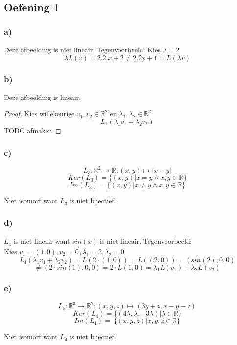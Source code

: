 \documentclass[lineaire_algebra_oplossingen.tex]{subfiles}
\begin{document}
\subsection{Oefening 1}
\subsubsection*{a)}
Deze afbeelding is niet lineair. Tegenvoorbeeld: Kies $\lambda = 2$\\
\[
\lambda L(v) = 2 . 2 . x + 2 \neq 2 . 2 x + 1 = L(\lambda v)
\]

\subsubsection*{b)}
Deze afbeelding is lineair.
\begin{proof}
Kies willekeurige $v_1, v_2 \in \mathbb{R}^2$ en $\lambda_1, \lambda_2 \in \mathbb{R}^2$
\[
L_2(\lambda_1v_1 + \lambda_2v_2)
\]
TODO afmaken
\end{proof}

\subsubsection*{c)}
$$
L_3:\mathbb{R}^2\rightarrow\mathbb{R}:(x,y)\mapsto |x-y|
$$
$$
Ker(L_3)= \{(x,y)|x=y \wedge x,y \in \mathbb{R} \}
$$
$$
Im(L_3)= \{(x,y)|x\neq y \wedge x,y \in \mathbb{R} \}
$$
\begin{center}
Niet isomorf want $L_3$ is niet bijectief.
\end{center}

\subsubsection*{d)}
$L_4$ is niet lineair want $sin(x)$ is niet lineair.
Tegenvoorbeeld:\\
Kies $v_1=(1,0),v_2=\vec{0},\lambda_1 = 2,\lambda_2=0$
\[
L_4(\lambda_1v_1+\lambda_2v_2) = L(2\cdot(1,0))= L((2,0))=(sin(2),0,0)
\]
\[
\neq (2\cdot sin(1),0,0) = 2\cdot L(1,0) = \lambda_1L(v_1)+\lambda_2L(v_2)
\]

\subsubsection*{e)}
$$
L_5:\mathbb{R}^3\rightarrow\mathbb{R}^2:(x,y,z)\mapsto (3y+z,x-y-z)
$$
$$
Ker(L_4)= \{(4\lambda ,\lambda ,-3\lambda)|\lambda \in \mathbb{R} \}
$$
$$
Im(L_4)= \ \{(x ,y ,z)|x,y,z \in \mathbb{R} \}
$$
\begin{center}
Niet isomorf want $L_4$ is niet bijectief.
\end{center}
\end{document}

